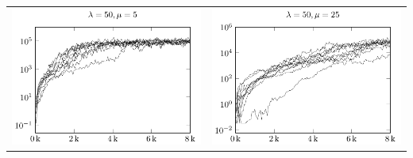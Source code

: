 \begin{tabular}{@{}l@{}l@{}}
\includegraphics[scale=1]{plots/ce_ConstantNoise_l50_o5_all} &
\includegraphics[scale=1]{plots/ce_ConstantNoise_l50_o25_all}
\end{tabular}

